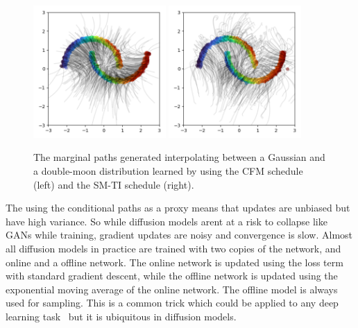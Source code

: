 \begin{figure}[ht]
    \centering
    \includegraphics[width=0.45\textwidth]{Figures/transformers/fm.png}
    \includegraphics[width=0.45\textwidth]{Figures/transformers/vp.png}
    \caption{The marginal paths generated interpolating between a Gaussian and a double-moon distribution learned by using the CFM schedule (left) and the SM-TI schedule (right).}
    \label{fig:vp_vs_cfm}
\end{figure}

The using the conditional paths as a proxy means that updates are unbiased but have high variance.
So while diffusion models arent at a risk to collapse like GANs while training, gradient updates are noisy and convergence is slow.
Almost all diffusion models in practice are trained with two copies of the network, and online and a offline network.
The online network is updated using the loss term with standard gradient descent, while the offline network is updated using the exponential moving average of the online network.
The offline model is always used for sampling.
This is a common trick which could be applied to any deep learning task~\cite{Adam} but it is ubiquitous in diffusion models.

